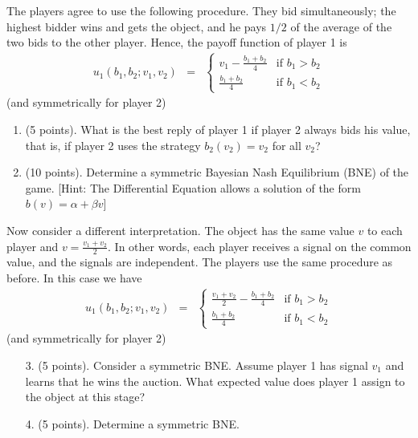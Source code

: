 \documentclass[a4paper]{article}
\begin{document}
The players agree to use the following procedure. They bid simultaneously; the highest bidder wins and gets the object, and he pays $1/2$ of the average of the two bids to the other player. Hence, the payoff function of player 1 is
\begin{eqnarray*}
u_{1}(b_{1},b_{2};v_{1},v_{2})&=&\begin{cases}
v_{1}-\frac{b_{1}+b_{2}}{4}	&\text{if $b_{1}>b_{2}$}\\
\frac{b_{1}+b_{2}}{4}	&\text{if $b_{1}<b_{2}$}
\end{cases}
\end{eqnarray*}
(and symmetrically for player 2)
\begin{enumerate}
	\item (5 points). What is the best reply of player 1 if player 2 always bids his value, that is, if player 2 uses the strategy $b_{2}(v_{2})=v_{2}$ for all $v_{2}$?
	\item (10 points). Determine a symmetric Bayesian Nash Equilibrium (BNE) of the game. [Hint: The Differential Equation allows a solution of the form $b(v)=\alpha+\beta v$]
\end{enumerate}
Now consider a different interpretation. The object has the same value $v$ to each player and $v=\frac{v_{1}+v_{2}}{2}$. In other words, each player receives a signal on the common value, and the signals are independent. The players use the same procedure as before. In this case we have
\begin{eqnarray*}
u_{1}(b_{1},b_{2};v_{1},v_{2})&=&\begin{cases}
\frac{v_{1}+v_{2}}{2}-\frac{b_{1}+b_{2}}{4}	&\text{if $b_{1}>b_{2}$}\\
\frac{b_{1}+b_{2}}{4}	&\text{if $b_{1}<b_{2}$}
\end{cases}
\end{eqnarray*}(and symmetrically for player 2)
\begin{enumerate}
	\item [3.] (5 points). Consider a symmetric BNE. Assume player 1 has signal $v_{1}$ and learns that he wins the auction. What expected value does player 1 assign to the object at this stage?
	\item [4.] (5 points). Determine a symmetric BNE.
\end{enumerate}
\end{document}
